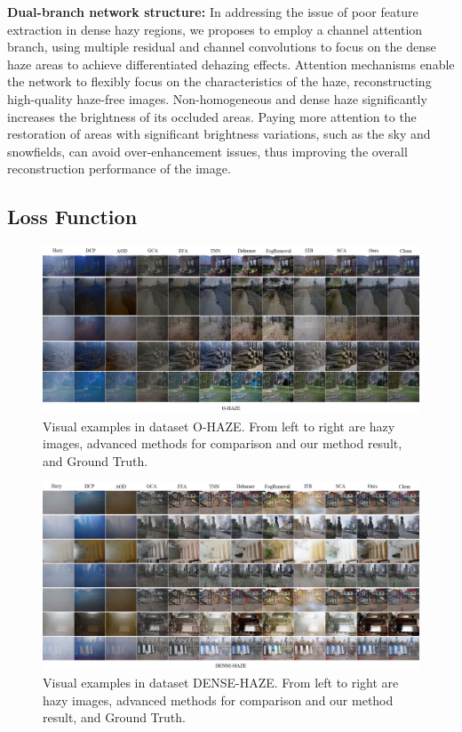 \documentclass[lettersize,journal]{IEEEtran}
\begin{document}
{\bf{Dual-branch network structure:}}
In addressing the issue of poor feature extraction in dense hazy regions, we proposes to employ a channel attention branch, using multiple residual and channel convolutions to focus on the dense haze areas to achieve differentiated dehazing effects.
Attention mechanisms enable the network to flexibly focus on the characteristics of the haze, reconstructing high-quality haze-free images. Non-homogeneous and dense haze significantly increases the brightness of its occluded areas. Paying more attention to the restoration of areas with significant brightness variations, such as the sky and snowfields, can avoid over-enhancement issues, thus improving the overall reconstruction performance of the image.

\subsection{Loss Function}

\begin{figure}[!t]
	\centering
	\includegraphics[width=7in]{O-HAZE-compare}
	\caption{Visual examples in dataset O-HAZE. From left to right are hazy images, advanced methods for comparison and our method result, and Ground Truth.}
	\label{fig6}
\end{figure}

\begin{figure}[!t]
	\centering
	\includegraphics[width=7in]{DENSE-HAZE-compare}
	\caption{Visual examples in dataset DENSE-HAZE. From left to right are hazy images, advanced methods for comparison and our method result, and Ground Truth.}
	\label{fig7}
\end{figure}
\end{document}
